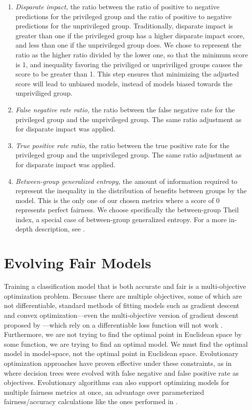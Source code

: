 \documentclass[10pt]{acmart}
\begin{document}
\begin{enumerate}
	\item \textit{Disparate impact,} the ratio between the ratio of positive to negative predictions for the privileged group and the ratio of positive to negative predictions for the unprivileged group. Traditionally, disparate impact is greater than one if the privileged group has a higher disparate impact score, and less than one if the unprivileged group does. We chose to represent the ratio as the higher ratio divided by the lower one, so that the minimum score is 1, and inequality favoring the priviliged or unpriviliged groups causes the score to be greater than 1. This step ensures that minimizing the adjusted score will lead to unbiased models, instead of models biased towards the unpriviliged group.
	\item \textit{False negative rate ratio,} the ratio between the false negative rate for the privileged group and the unprivileged group. The same ratio adjustment as for disparate impact was applied.
	\item \textit{True positive rate ratio,} the ratio between the true positive rate for the privileged group and the unprivileged group. The same ratio adjustment as for disparate impact was applied.
	\item \textit{Between-group generalized entropy,} the amount of information required to represent the inequality in the distribution of benefits between groups by the model. This is the only one of our chosen metrics where a score of 0 represents perfect fairness. We choose specifically the between-group Theil index, a special case of between-group generalized entropy. For a more in-depth description, see \cite{Speicher:2018}.
\end{enumerate}

\section{Evolving Fair Models}
Training a classification model that is both accurate and fair is a multi-objective optimization problem. Because there are multiple objectives, some of which are not differentiable, standard methods of fitting models such as gradient descent and convex optimization---even the multi-objective version of gradient descent proposed by \citep{Desideri:2012}---which rely on a differentiable loss function will not work \citep{Zerbinati:2011}. Furthermore, we are not trying to find the optimal point in Euclidean space by some function, we are trying to find an optimal model. We must find the optimal model in model-space, not the optimal point in Euclidean space. Evolutionary optimization approaches have proven effective under these constraints, as in \citep{Zhao:2007} where decision trees were evolved with false negative and false positive rate as objectives. Evolutionary algorithms can also support optimizing models for multiple fairness metrics at once, an advantage over parameterized fairness/accuracy calculations like the ones performed in \citep{Friedler:2019}.
\end{document}
